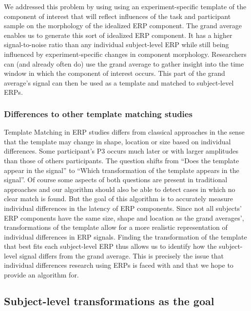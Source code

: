 \documentclass[
  man,floatsintext]{apa7}
\begin{document}
We addressed this problem by using using an experiment-specific template of the component of interest that will reflect influences of the task and participant sample on the morphology of the idealized ERP component. The grand average enables us to generate this sort of idealized ERP component. It has a higher signal-to-noise ratio than any individual subject-level ERP while still being influenced by experiment-specific changes in component morphology. Researchers can (and already often do) use the grand average to gather insight into the time window in which the component of interest occurs. This part of the grand average's signal can then be used as a template and matched to subject-level ERPs.

\hypertarget{differences-to-other-template-matching-studies}{%
\subsubsection{Differences to other template matching studies}\label{differences-to-other-template-matching-studies}}

Template Matching in ERP studies differs from classical approaches in the sense that the template may change in shape, location or size based on individual differences. Some participant's P3 occurs much later or with larger amplitudes than those of others participants. The question shifts from ``Does the template appear in the signal'' to ``Which transformation of the template appears in the signal''. Of course some aspects of both questions are present in traditional approaches and our algorithm should also be able to detect cases in which no clear match is found. But the goal of this algorithm is to accurately measure individual differences in the latency of ERP components. Since not all subjects' ERP components have the same size, shape and location as the grand averages', transformations of the template allow for a more realistic representation of individual differences in ERP signals. Finding the transformation of the template that best fits each subject-level ERP thus allows us to identify how the subject-level signal differs from the grand average. This is precisely the issue that individual differences research using ERPs is faced with and that we hope to provide an algorithm for.

\hypertarget{subject-level-transformations-as-the-goal}{%
\subsection{Subject-level transformations as the goal}\label{subject-level-transformations-as-the-goal}}
\end{document}

